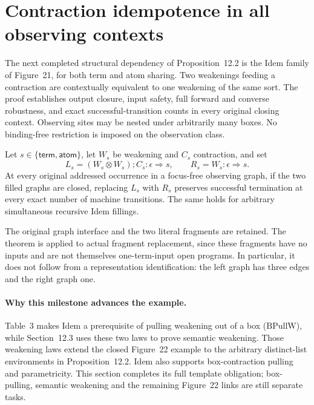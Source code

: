 \clearpage
\section{Contraction idempotence in all observing contexts}
\label{sec:copying-contraction-idempotence}
The next completed structural dependency of Proposition~12.2 is the Idem
family of Figure~21, for both term and atom sharing. Two weakenings feeding
a contraction are contextually equivalent to one weakening of the same sort.
The proof establishes output closure, input safety, full forward and converse
robustness, and exact successful-transition counts in every original closing
context. Observing sites may be nested under arbitrarily many boxes. No
binding-free restriction is imposed on the observation class.

\begin{theorem}
Let $s\in\{\mathsf{term},\mathsf{atom}\}$, let $W_s$ be weakening and $C_s$
contraction, and set
\[
 L_s=(W_s\otimes W_s);C_s : \epsilon\Rightarrow s,
 \qquad R_s=W_s : \epsilon\Rightarrow s.
\]
At every original addressed occurrence in a focus-free observing graph,
if the two filled graphs are closed, replacing $L_s$ with $R_s$ preserves
successful termination at every exact number of machine transitions.
The same holds for arbitrary simultaneous recursive Idem fillings.
\end{theorem}
The original graph interface and the two literal fragments are retained.
The theorem is applied to actual fragment replacement, since these fragments
have no inputs and are not themselves one-term-input open programs.
In particular, it does not follow from a representation identification:
the left graph has three edges and the right graph one.

\paragraph{Why this milestone advances the example.}
Table~3 makes Idem a prerequisite of pulling weakening out of a box
($\mathrm{BPullW}$), while Section~12.3 uses these two laws to prove semantic
weakening. Those weakening laws extend the closed Figure~22 example to the
arbitrary distinct-list environments in Proposition~12.2. Idem also supports
box-contraction pulling and parametricity. This section completes its full
template obligation; box-pulling, semantic weakening and the remaining
Figure~22 links are still separate tasks.

